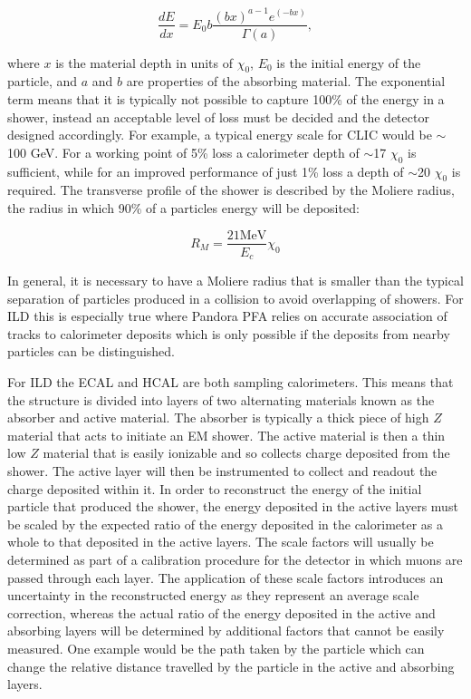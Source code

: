 \begin{equation}
  \label{bethebloch}
\frac{dE}{dx}=E_0 b \frac{(bx)^{a-1}e^(-bx)}{\Gamma(a)},
\end{equation}

where $x$ is the material depth in units of $\chi_0$, $E_0$ is the initial energy of the particle, and $a$ and $b$ are properties of the absorbing material. The exponential term means that it is typically not possible to capture 100\% of the energy in a shower, instead an acceptable level of loss must be decided and the detector designed accordingly. For example, a typical energy scale for \ac{CLIC} would be $\sim$ 100 GeV. For a working point of 5\% loss a calorimeter depth of $\sim$17 $\chi_0$ is sufficient, while for an improved performance of just 1\% loss a depth of $\sim$20 $\chi_0$ is required. The transverse profile of the shower is described by the Moliere radius, the radius in which 90\% of a particles energy will be deposited:

\begin{equation}
R_M=\frac{21\text{MeV}}{E_c}\chi_0
\end{equation}

In general, it is necessary to have a Moliere radius that is smaller than the typical separation of particles produced in a collision to avoid overlapping of showers. For \ac{ILD} this is especially true where Pandora \ac{PFA} relies on accurate association of tracks to calorimeter deposits which is only possible if the deposits from nearby particles can be distinguished.

For \ac{ILD} the \ac{ECAL} and \ac{HCAL} are both sampling calorimeters. This means that the structure is divided into layers of two alternating materials known as the absorber and active material. The absorber is typically a thick piece of high $Z$ material that acts to initiate an \ac{EM} shower. The active material is then a thin low $Z$ material that is easily ionizable and so collects charge deposited from the shower. The active layer will then be instrumented to collect and readout the charge deposited within it. In order to reconstruct the energy of the initial particle that produced the shower, the energy deposited in the active layers must be scaled by the expected ratio of the energy deposited in the calorimeter as a whole to that deposited in the active layers. The scale factors will usually be determined as part of a calibration procedure for the detector in which muons are passed through each layer. The application of these scale factors introduces an uncertainty in the reconstructed energy as they represent an average scale correction, whereas the actual ratio of the energy deposited in the active and absorbing layers will be determined by additional factors that cannot be easily measured. One example would be the path taken by the particle which can change the relative distance travelled by the particle in the active and absorbing layers.

